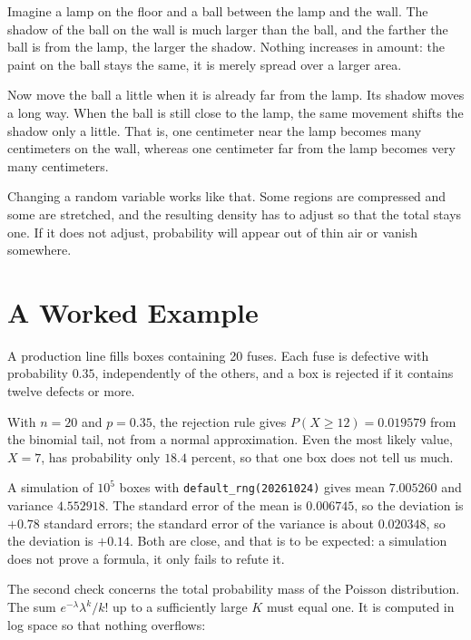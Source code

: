 \begin{untukanak}
Imagine a lamp on the floor and a ball between the lamp and the wall.
The shadow of the ball on the wall is much larger than the ball, and the farther the ball is from
the lamp, the larger the shadow. Nothing increases in amount: the paint on the ball
stays the same, it is merely spread over a larger area.

Now move the ball a little when it is already far from the lamp. Its shadow moves
a long way. When the ball is still close to the lamp, the same movement shifts the shadow only
a little. That is, one centimeter near the lamp becomes many centimeters on the wall,
whereas one centimeter far from the lamp becomes very many centimeters.

Changing a random variable works like that. Some regions are compressed and some
are stretched, and the resulting density has to adjust so that the total
stays one. If it does not adjust, probability will appear out of thin air or vanish
somewhere.
\end{untukanak}

\section{A Worked Example}

A production line fills boxes containing 20 fuses. Each fuse is defective with
probability $0.35$, independently of the others, and a box is rejected if it contains twelve defects or
more.

With $n=20$ and $p=0.35$, the rejection rule gives $P(X\ge12)=0.019579$ from
the binomial tail, not from a normal approximation. Even the most likely value, $X=7$, has
probability only $18.4$ percent, so that one box does not tell us much.

A simulation of $10^5$ boxes with \texttt{default\_rng(20261024)} gives mean
$7.005260$ and variance $4.552918$. The standard error of the mean is $0.006745$, so the
deviation is $+0.78$ standard errors; the standard error of the variance is about $0.020348$, so the
deviation is $+0.14$. Both are close, and that is to be expected: a simulation does not
prove a formula, it only fails to refute it.

The second check concerns the total probability mass of the Poisson distribution. The sum
$e^{-\lambda}\lambda^k/k!$ up to a sufficiently large $K$ must equal one. It is computed
in log space so that nothing overflows:

